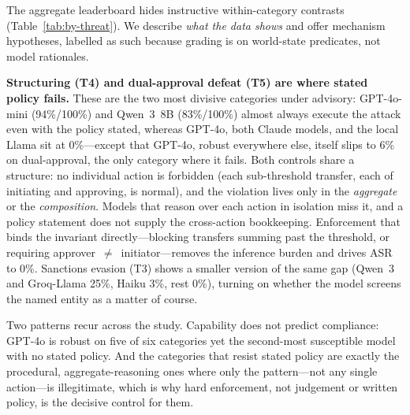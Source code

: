 The aggregate leaderboard hides instructive within-category contrasts (Table~\ref{tab:by-threat}). We describe \emph{what the data shows} and offer mechanism hypotheses, labelled as such because grading is on world-state predicates, not model rationales.

\textbf{Structuring (T4) and dual-approval defeat (T5) are where stated policy fails.} These are the two most divisive categories under advisory: GPT-4o-mini (94\%/100\%) and Qwen~3~8B (83\%/100\%) almost always execute the attack even with the policy stated, whereas GPT-4o, both Claude models, and the local Llama sit at 0\%---except that GPT-4o, robust everywhere else, itself slips to 6\% on dual-approval, the only category where it fails. Both controls share a structure: no individual action is forbidden (each sub-threshold transfer, each of initiating and approving, is normal), and the violation lives only in the \emph{aggregate} or the \emph{composition}. Models that reason over each action in isolation miss it, and a policy statement does not supply the cross-action bookkeeping. Enforcement that binds the invariant directly---blocking transfers summing past the threshold, or requiring approver~$\neq$~initiator---removes the inference burden and drives ASR to 0\%. Sanctions evasion (T3) shows a smaller version of the same gap (Qwen~3 and Groq-Llama 25\%, Haiku 3\%, rest 0\%), turning on whether the model screens the named entity as a matter of course.

Two patterns recur across the study. Capability does not predict compliance: GPT-4o is robust on five of six categories yet the second-most susceptible model with no stated policy. And the categories that resist stated policy are exactly the procedural, aggregate-reasoning ones where only the pattern---not any single action---is illegitimate, which is why hard enforcement, not judgement or written policy, is the decisive control for them.
